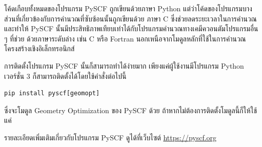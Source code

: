โค้ดเกือบทั้งหมดของโปรแกรม PySCF ถูกเขียนด้วยภาษา Python แต่ว่าโค้ดของโปรแกรมบางส่วนที่เกี่ยวข้องกับการคำนวณที่ซับซ้อนนั้นถูกเขียนด้วย%
ภาษา C ซึ่งช่วยลดระยะเวลาในการคำนวณและทำให้ PySCF นั้นมีประสิทธิภาพเทียบเท่าได้กับโปรแกรมคำนวณทางเคมีควอนตัมโปรแกรมอื่น ๆ ที่ช่วย%
ด้วยภาษาระดับล่าง เช่น C หรือ Fortran นอกเหนือจากโมดูลหลักที่ใช้ในการคำนวณโครงสร้างเชิงอิเล็กทรอนิกส์

การติดตั้งโปรแกรม PySCF นั้นก็สามารถทำได้ง่ายมาก เพียงแค่ผู้ใช้งานมีโปรแกรม Python เวอร์ชั่น 3 ก็สามารถติดตั้งได้โดยใช้คำสั่งต่อไปนี้

\begin{lstlisting}[style=MyBash]
pip install pyscf[geomopt]
\end{lstlisting}

\noindent ซึ่งจะโมดูล Geometry Optimization ของ PySCF ด้วย ถ้าหากไม่ต้องการติดตั้งโมดูลนี้ก็ให้ใช้แค่ 

รายละเอียดเพิ่มเติมเกี่ยวกับโปรแกรม PySCF ดูได้ที่เว็บไซต์ \url{https://pyscf.org}
